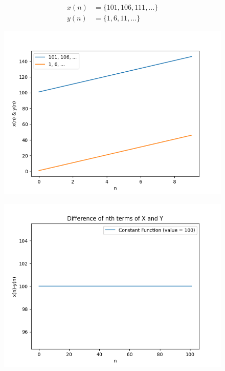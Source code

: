 \documentclass[journal,12pt,onecolumn]{IEEEtran}
\theoremstyle{remark}
\begin{document}
\begin{align}
x(n)&= \{101,106,111,...\} \\
y(n)&= \{1,6,11,... \} 
\end{align}


\begin{figure}
    \centering
    \includegraphics{./figs/fig2.png}
    \caption{ }
    \label{fig:x(n) & y(n) }
\end{figure}

\begin{figure}
    \centering
    \includegraphics{./figs/fig1.png}
    \caption{ }
    \label{fig:difference of x(n) & y(n) }
\end{figure}
\end{document}
